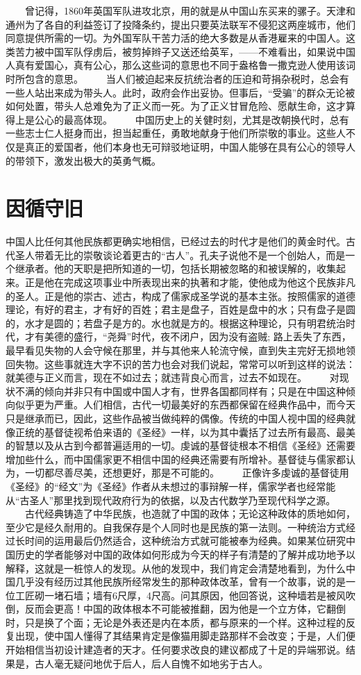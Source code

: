 \documentclass[12pt,oneside]{book}
\begin{document}
\begin{common-format}
　　曾记得，1860年英国军队进攻北京，用的就是从中国山东买来的骡子。天津和通州为了各自的利益签订了投降条约，提出只要英法联军不侵犯这两座城市，他们同意提供所需的一切。为外国军队干苦力活的绝大多数是从香港雇来的中国人。这类苦力被中国军队俘虏后，被剪掉辫子又送还给英军，——不难看出，如果说中国人真有爱国心，真有公心，那么这些词的意思也不同于盎格鲁一撒克逊人使用该词时所包含的意思。 
　　当人们被迫起来反抗统治者的压迫和苛捐杂税时，总会有一些人站出来成为带头人。此时，政府会作出妥协。但事后，“受骗”的群众无论被如何处置，带头人总难免为了正义而一死。为了正义甘冒危险、愿献生命，这才算得上是公心的最高体现。 
　　中国历史上的关健时刻，尤其是改朝换代时，总有一些志士仁人挺身而出，担当起重任，勇敢地献身于他们所崇敬的事业。这些人不仅是真正的爱国者，他们本身也无可辩驳地证明，中国人能够在具有公心的领导人的带领下，激发出极大的英勇气概。 

\chapter{因循守旧}
中国人比任何其他民族都更确实地相信，已经过去的时代才是他们的黄金时代。古代圣人带着无比的崇敬谈论着更古的“古人”。孔夫子说他不是一个创始人，而是一个继承者。他的天职是把所知道的一切，包括长期被忽略的和被误解的，收集起来。正是他在完成这项事业中所表现出来的执著和才能，使他成为他这个民族非凡的圣人。正是他的崇古、述古，构成了儒家成圣学说的基本主张。按照儒家的道德理论，有好的君主，才有好的百姓；君主是盘子，百姓是盘中的水；只有盘子是圆的，水才是圆的；若盘子是方的。水也就是方的。根据这种理论，只有明君统治时代，才有美德的盛行，“尧舜”时代，夜不闭户，因为没有盗贼; 路上丢失了东西，最早看见失物的人会守候在那里，并与其他来人轮流守候，直到失主完好无损地领回失物。这些事就连大字不识的苦力也会对我们说起，常常可以听到这样的说法：就美德与正义而言，现在不如过去；就违背良心而言，过去不如现在。 
　　对现状不满的倾向并非只有中国或中国人才有，世界各国都同样有；只是在中国这种倾向似乎更为严重。人们相信，古代一切最美好的东西都保留在经典作品中，而今天只是继承而已，因此，这些作品被当做纯粹的偶像。传统的中国人视中国的经典就像正统的基督徒视希伯来语的《圣经》一样，以为其中囊括了过去所有最高、最美的智慧以及从古到今都普遍适用的一切。虔诚的基督徒根本不相信《圣经》还需要增加些什么，而中国儒家更不相信中国的经典还需要有所增补。基督徒与儒家都认为，一切都尽善尽美，还想更好，那是不可能的。 
　　正像许多虔诚的基督徒用《圣经》的“经文”为《圣经》作者从未想过的事辩解一样，儒家学者也经常能从“古圣人”那里找到现代政府行为的依据，以及古代数学乃至现代科学之源。 
　　古代经典铸造了中华民族，也造就了中国的政体；无论这种政体的质地如何，至少它是经久耐用的。自我保存是个人同时也是民族的第一法则。一种统治方式经过长时间的运用最后仍然适合，这种统治方式就可能被奉为经典。如果某位研究中国历史的学者能够对中国的政体如何形成为今天的样子有清楚的了解并成功地予以解释，这就是一桩惊人的发现。从他的发现中，我们肯定会清楚地看到，为什么中国几乎没有经历过其他民族所经常发生的那种政体改革，曾有一个故事，说的是一位工匠砌一堵石墙；墙有6尺厚，4尺高。问其原因，他回答说，这种墙若是被风吹倒，反而会更高！中国的政体根本不可能被推翻，因为他是一个立方体，它翻倒时，只是换了个面；无论是外表还是内在本质，都与原来的一个样。这种过程的反复出现，使中国人懂得了其结果肯定是像猫用脚走路那样不会改变；于是，人们便开始相信当初设计建造者的天才。任何要求改良的建议都成了十足的异端邪说。结果是，古人毫无疑问地优于后人，后人自愧不如地劣于古人。 

\end{common-format}
\end{document}
